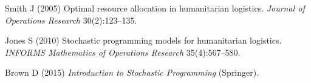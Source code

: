 \documentclass[opre,sglanonrev]{informs4}
\begin{document}





%

\begin{thebibliography}{3}
\providecommand{\natexlab}[1]{#1}
\providecommand{\url}[1]{\texttt{#1}}
\providecommand{\urlprefix}{URL }

Smith J (2005) Optimal resource allocation in humanitarian logistics.
  \emph{Journal of Operations Research} 30(2):123--135.
  
Jones S (2010) Stochastic programming models for humanitarian logistics.
  \emph{INFORMS Mathematics of Operations Research} 35(4):567--580.

Brown D (2015) \emph{Introduction to Stochastic Programming} (Springer).

\end{thebibliography}


\end{document}
